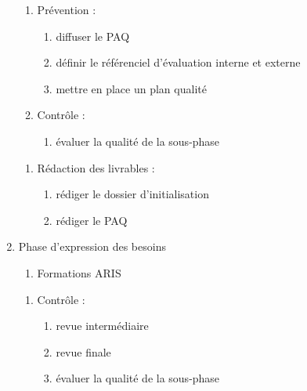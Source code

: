 \begin{enumerate}
          \begin{enumerate}
            \item Prévention :
                \begin{enumerate}
                  \item diffuser le PAQ 
                  \item définir le référenciel d'évaluation interne et externe 
                  \item mettre en place un plan qualité 
                \end{enumerate}
            \item Contrôle :
                \begin{enumerate}
                  \item évaluer la qualité de la sous-phase
                \end{enumerate}
          \end{enumerate}

          \begin{enumerate}
            \item Rédaction des livrables : 
                \begin{enumerate}
                  \item rédiger le dossier d'initialisation 
                  \item rédiger le PAQ 
                \end{enumerate}
          \end{enumerate}

    \item Phase d'expression des besoins
          \begin{enumerate}
            \item Formations ARIS
          \end{enumerate}

          \begin{enumerate}
            \item Contrôle :
                \begin{enumerate}
                  \item revue intermédiaire 
                  \item revue finale 
                  \item évaluer la qualité de la sous-phase 
                \end{enumerate}
          \end{enumerate}


\end{enumerate}
